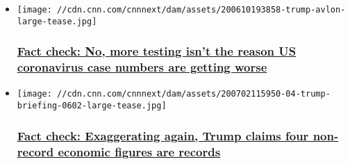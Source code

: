 \begin{itemize}
\item
  \href{/2020/07/09/politics/fact-check-coronavirus-cases-donald-trump-testing/index.html}{}

  \texttt{[image: //cdn.cnn.com/cnnnext/dam/assets/200610193858-trump-avlon-large-tease.jpg]}

  \hypertarget{fact-check-no-more-testing-isnt-the-reason-us-coronavirus-case-numbers-are-getting-worse}{%
  \subsubsection{\texorpdfstring{\href{/2020/07/09/politics/fact-check-coronavirus-cases-donald-trump-testing/index.html}{Fact
  check: No, more testing isn't the reason US coronavirus case numbers
  are getting
  worse}}{Fact check: No, more testing isn't the reason US coronavirus case numbers are getting worse}}\label{fact-check-no-more-testing-isnt-the-reason-us-coronavirus-case-numbers-are-getting-worse}}
\item
  \href{/2020/07/06/politics/fact-check-trump-june-jobs-exaggerations/index.html}{}

  \texttt{[image: //cdn.cnn.com/cnnnext/dam/assets/200702115950-04-trump-briefing-0602-large-tease.jpg]}

  \hypertarget{fact-check-exaggerating-again-trump-claims-four-non-record-economic-figures-are-records}{%
  \subsubsection{\texorpdfstring{\href{/2020/07/06/politics/fact-check-trump-june-jobs-exaggerations/index.html}{Fact
  check: Exaggerating again, Trump claims four non-record economic
  figures are
  records}}{Fact check: Exaggerating again, Trump claims four non-record economic figures are records}}\label{fact-check-exaggerating-again-trump-claims-four-non-record-economic-figures-are-records}}
\end{itemize}

